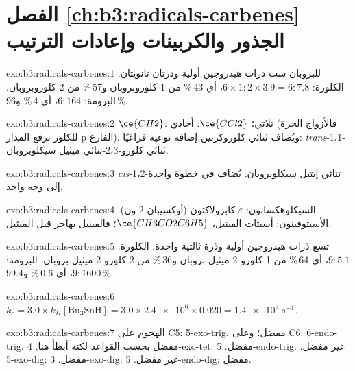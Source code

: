 \section*{الفصل \ref{ch:b3:radicals-carbenes} --- الجذور والكربينات وإعادات الترتيب}

\begin{solution}{exo:b3:radicals-carbenes:1}
للبروبان ست ذرات هيدروجين أولية وذرتان ثانويتان. الكلورة: $6 \times 1 : 2 \times 3.9 = 6 : 7.8$،
أي 43\,\% من 1-كلوروبروبان و57\,\% من 2-كلوروبروبان. البرومة: $6 : 164$، أي 4\,\% 
و96\,\%.
\end{solution}

\begin{solution}{exo:b3:radicals-carbenes:2}
$\ce{CH2}$: ثلاثي؛ $\ce{CCl2}$: أحادي (فالأزواج الحرة للكلور ترفع المدار p الفارغ).
ويُضاف ثنائي كلوروكربين إضافة نوعية فراغيًا: \textit{trans}-1،1-ثنائي كلورو-2،3-ثنائي ميثيل سيكلوبروبان.
\end{solution}

\begin{solution}{exo:b3:radicals-carbenes:3}
\textit{cis}-1،2-ثنائي إيثيل سيكلوبروبان: يُضاف  في خطوة واحدة إلى وجه واحد.
\end{solution}

\begin{solution}{exo:b3:radicals-carbenes:4}
السيكلوهكسانون: $\varepsilon$-كابرولاكتون (أوكسيبان-2-ون). الأسيتوفينون: أسيتات الفينيل،
$\ce{CH3CO2C6H5}$؛ فالفينيل يهاجر قبل الميثيل.
\end{solution}

\begin{solution}{exo:b3:radicals-carbenes:5}
تسع ذرات هيدروجين أولية وذرة ثالثية واحدة. الكلورة: $9 : 5.1$، أي 64\,\% من 1-كلورو-2-ميثيل بروبان
و36\,\% من 2-كلورو-2-ميثيل بروبان. البرومة: $9 : 1600$، أي 0.6\,\% و99.4\,\%.
\end{solution}

\begin{solution}{exo:b3:radicals-carbenes:6}
$k_c = 3.0 \times k_H[\mathrm{Bu_3SnH}] = 3.0 \times \num{2.4e6} \times 0.020 = \qty{1.4e5}{s^{-1}}$.
\end{solution}

\begin{solution}{exo:b3:radicals-carbenes:7}
الهجوم على C5: 5-exo-trig، مفضل؛ وعلى C6: 6-endo-trig، مفضل بحسب القواعد لكنه
أبطأ هنا. 4-exo-tet: مفضل. 5-endo-trig: غير مفضل. 5-exo-dig: مفضل.
3-exo-dig: غير مفضل. 5-endo-dig: مفضل.
\end{solution}

